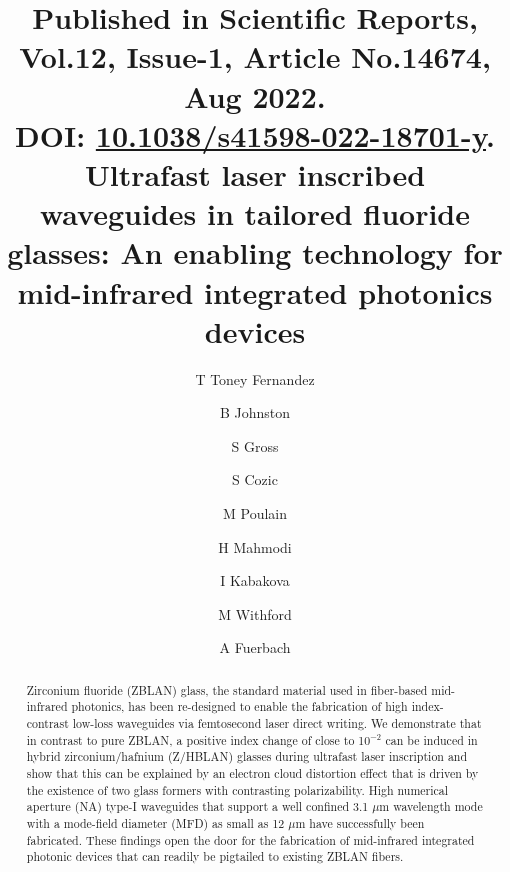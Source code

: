 \documentclass[11pt]{article}
\date{}
\begin{document}
\title{Published in \textbf{Scientific Reports}, Vol.\textbf{12}, Issue-1, Article No.\textbf{14674}, Aug 2022.\\
DOI: \href{https://www.nature.com/articles/s41598-022-18701-y.pdf}{10.1038/s41598-022-18701-y}.
\\Ultrafast laser inscribed waveguides in tailored fluoride glasses: An enabling technology for mid-infrared integrated photonics devices}

\author[1,*]{T Toney Fernandez}
\author[1]{B Johnston}
\author[1]{S Gross}
\author[2]{S Cozic}
\author[2]{M Poulain}
\author[3]{H Mahmodi}
\author[3]{I Kabakova}
\author[1]{M Withford}
\author[1]{A Fuerbach}


\begin{titlepage}
\maketitle

\thispagestyle{empty}

\begin{abstract}
Zirconium fluoride (ZBLAN) glass, the standard material used in fiber-based mid-infrared photonics, has been re-designed to enable the fabrication of high index-contrast low-loss waveguides via femtosecond laser direct writing. We demonstrate that in contrast to pure ZBLAN, a positive index change of close to 10$^{-2}$ can be induced in hybrid zirconium/hafnium (Z/HBLAN) glasses during ultrafast laser inscription and show that this can be explained by an electron cloud distortion effect that is driven by the existence of two glass formers with contrasting polarizability. High numerical aperture (NA) type-I waveguides that support a well confined 3.1 $\mu$m wavelength mode with a mode-field diameter (MFD) as small as 12 $\mu$m have successfully been fabricated. These findings open the door for the fabrication of mid-infrared integrated photonic devices that can readily be pigtailed to existing ZBLAN fibers. 
\end{abstract}

\end{titlepage}
\end{document}
